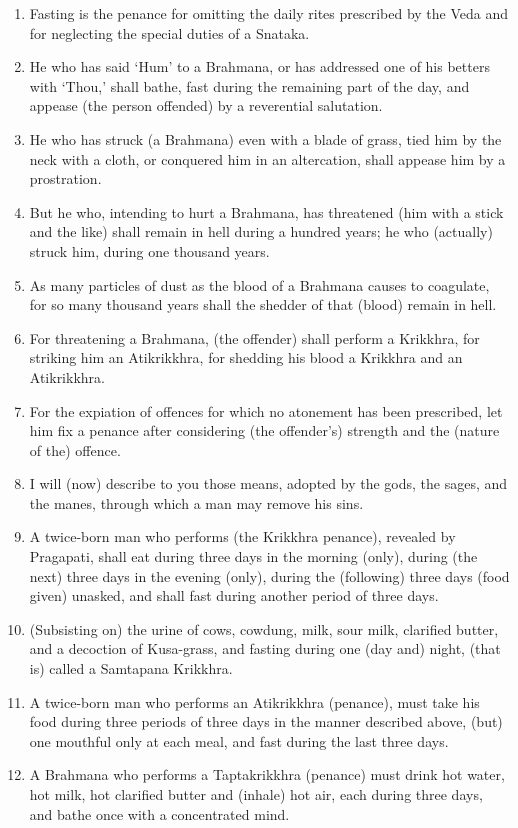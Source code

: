 \begin{enumerate}
\item Fasting is the penance for omitting the daily rites prescribed by the Veda and for neglecting the special duties of a Snataka.
\item He who has said `Hum' to a Brahmana, or has addressed one of his betters with `Thou,' shall bathe, fast during the remaining part of the day, and appease (the person offended) by a reverential salutation.
\item He who has struck (a Brahmana) even with a blade of grass, tied him by the neck with a cloth, or conquered him in an altercation, shall appease him by a prostration.
\item But he who, intending to hurt a Brahmana, has threatened (him with a stick and the like) shall remain in hell during a hundred years; he who (actually) struck him, during one thousand years.
\item As many particles of dust as the blood of a Brahmana causes to coagulate, for so many thousand years shall the shedder of that (blood) remain in hell.
\item For threatening a Brahmana, (the offender) shall perform a Krikkhra, for striking him an Atikrikkhra, for shedding his blood a Krikkhra and an Atikrikkhra.
\item For the expiation of offences for which no atonement has been prescribed, let him fix a penance after considering (the offender's) strength and the (nature of the) offence.
\item I will (now) describe to you those means, adopted by the gods, the sages, and the manes, through which a man may remove his sins.
\item A twice-born man who performs (the Krikkhra penance), revealed by Pragapati, shall eat during three days in the morning (only), during (the next) three days in the evening (only), during the (following) three days (food given) unasked, and shall fast during another period of three days.
\item (Subsisting on) the urine of cows, cowdung, milk, sour milk, clarified butter, and a decoction of Kusa-grass, and fasting during one (day and) night, (that is) called a Samtapana Krikkhra.
\item A twice-born man who performs an Atikrikkhra (penance), must take his food during three periods of three days in the manner described above, (but) one mouthful only at each meal, and fast during the last three days.
\item A Brahmana who performs a Taptakrikkhra (penance) must drink hot water, hot milk, hot clarified butter and (inhale) hot air, each during three days, and bathe once with a concentrated mind.

\end{enumerate}
